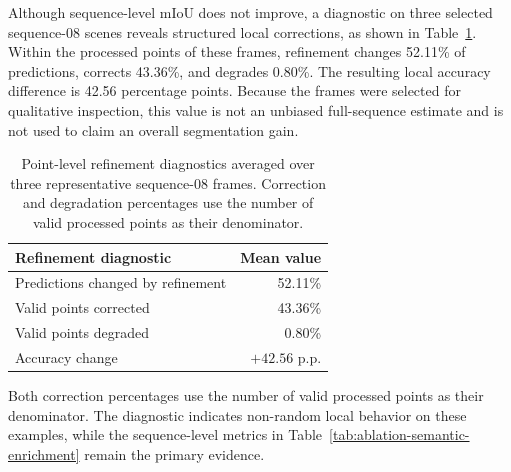 Although sequence-level mIoU does not improve, a diagnostic on three selected sequence-08 scenes reveals structured local corrections, as shown in Table~\ref{tab:ablation-refinement-diagnostics}. Within the processed points of these frames, refinement changes 52.11\% of predictions, corrects 43.36\%, and degrades 0.80\%. The resulting local accuracy difference is 42.56 percentage points. Because the frames were selected for qualitative inspection, this value is not an unbiased full-sequence estimate and is not used to claim an overall segmentation gain.
\begin{table}[t]
  \centering
  \caption{Point-level refinement diagnostics averaged over three
  representative sequence-08 frames. Correction and degradation percentages
  use the number of valid processed points as their denominator.}
  \label{tab:ablation-refinement-diagnostics}
  \small
  \setlength{\tabcolsep}{5pt}
  \renewcommand{\arraystretch}{1.08}
  \begin{tabular}{@{}lr@{}}
    \toprule
    Refinement diagnostic & Mean value \\
    \midrule
    Predictions changed by refinement & 52.11\% \\
    Valid points corrected & 43.36\% \\
    Valid points degraded & 0.80\% \\
    Accuracy change & $+42.56$ p.p. \\
    \bottomrule
  \end{tabular}
\end{table}
Both correction percentages use the number of valid processed points as their denominator. The diagnostic indicates non-random local behavior on these examples, while the sequence-level metrics in Table~\ref{tab:ablation-semantic-enrichment} remain the primary evidence.


